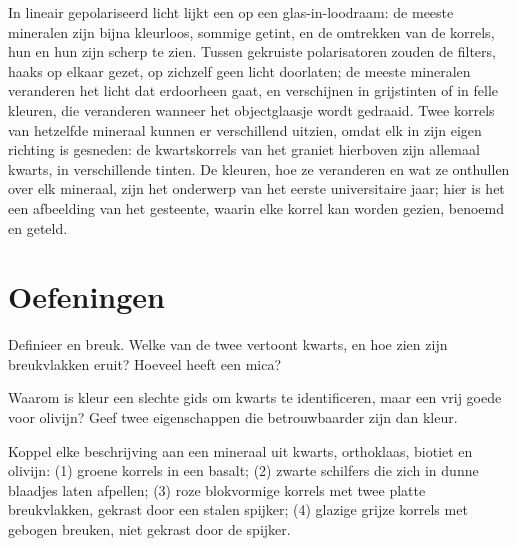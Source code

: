 In lineair gepolariseerd licht lijkt een  op een glas-in-loodraam:
de meeste mineralen zijn bijna kleurloos, sommige getint, en de omtrekken van de
korrels, hun  en hun  zijn scherp te zien. Tussen gekruiste
polarisatoren zouden de filters, haaks op elkaar gezet, op zichzelf geen licht
doorlaten; de meeste mineralen veranderen het licht dat erdoorheen gaat, en verschijnen
in grijstinten of in felle kleuren, die veranderen wanneer het objectglaasje wordt gedraaid.
Twee korrels van hetzelfde mineraal kunnen er verschillend uitzien, omdat elk in
zijn eigen richting is gesneden: de kwartskorrels van het graniet hierboven zijn allemaal kwarts,
in verschillende tinten. De kleuren, hoe ze veranderen en wat ze onthullen
over elk mineraal, zijn het onderwerp van het eerste universitaire jaar; hier is het
 een afbeelding van het gesteente, waarin elke korrel kan worden gezien,
benoemd en geteld.

\section{Oefeningen}

\begin{exercise}[$\star$]\label{exo:g11:minerals:1}
Definieer  en breuk. Welke van de twee vertoont kwarts, en hoe zien zijn
breukvlakken eruit? Hoeveel  heeft een mica?
\end{exercise}

\begin{exercise}[$\star$]\label{exo:g11:minerals:2}
Waarom is kleur een slechte gids om kwarts te identificeren, maar een vrij goede voor
olivijn? Geef twee eigenschappen die betrouwbaarder zijn dan kleur.
\end{exercise}

\begin{exercise}[$\star$]\label{exo:g11:minerals:3}
Koppel elke beschrijving aan een mineraal uit kwarts, orthoklaas, biotiet en
olivijn: (1) groene korrels in een basalt; (2) zwarte schilfers die zich in dunne
blaadjes laten afpellen; (3) roze blokvormige korrels met twee platte breukvlakken, gekrast door een
stalen spijker; (4) glazige grijze korrels met gebogen breuken, niet gekrast door de
spijker.
\end{exercise}

